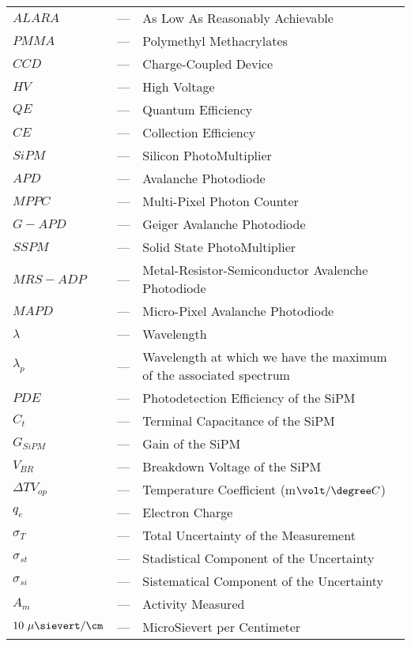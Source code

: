 \begin{longtable}{p{25mm} c p{120mm} }
$ALARA$ & --- & As Low As Reasonably Achievable\\
$PMMA$ & --- & Polymethyl Methacrylates\\
$CCD$ & --- & Charge-Coupled Device\\
$HV$ & --- & High Voltage\\
$QE$ & --- & Quantum Efficiency\\
$CE$ & --- & Collection Efficiency\\
$SiPM$ & --- & Silicon PhotoMultiplier\\
$APD$ & --- & Avalanche Photodiode\\
$MPPC$ & --- & Multi-Pixel Photon Counter\\
$G-APD$ & --- & Geiger Avalanche Photodiode\\
$SSPM$ & --- & Solid State PhotoMultiplier\\
$MRS-ADP$ & --- & Metal-Resistor-Semiconductor Avalenche Photodiode\\
$MAPD$ & --- & Micro-Pixel Avalanche Photodiode\\
$\lambda$ & --- & Wavelength\\
$\lambda_p$ & --- & Wavelength at which we have the maximum of the
\newline associated spectrum\\
$PDE$ & --- & Photodetection Efficiency of the SiPM\\
$C_t$ & --- & Terminal Capacitance of the SiPM\\
$G_{SiPM}$ & --- & Gain of the SiPM\\
$V_{BR}$ & --- & Breakdown Voltage of the SiPM\\
$\Delta TV_{op}$ & --- & Temperature Coefficient (m$\volt/\degree C$)\\
$q_{e}$ & --- & Electron Charge\\
$\sigma_{T}$ & --- & Total Uncertainty of the Measurement\\
$\sigma_{st}$ & --- & Stadistical Component of the Uncertainty\\
$\sigma_{si}$ & --- & Sistematical Component of the Uncertainty\\
$A_{m}$ & --- & Activity Measured\\
$10~\mu\sievert/\cm$ & --- & MicroSievert per Centimeter\\



\end{longtable}
